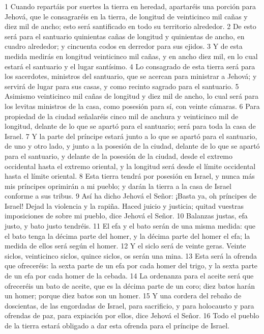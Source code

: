 1 Cuando repartáis por suertes la tierra en heredad, apartaréis una porción para Jehová, que le consagraréis en la tierra, de longitud de veinticinco mil cañas y diez mil de ancho; esto será santificado en todo su territorio alrededor.
2 De esto será para el santuario quinientas cañas de longitud y quinientas de ancho, en cuadro alrededor; y cincuenta codos en derredor para sus ejidos.
3 Y de esta medida medirás en longitud veinticinco mil cañas, y en ancho diez mil, en lo cual estará el santuario y el lugar santísimo.
4 Lo consagrado de esta tierra será para los sacerdotes, ministros del santuario, que se acercan para ministrar a Jehová; y servirá de lugar para sus casas, y como recinto sagrado para el santuario.
5 Asimismo veinticinco mil cañas de longitud y diez mil de ancho, lo cual será para los levitas ministros de la casa, como posesión para sí, con veinte cámaras.
6 Para propiedad de la ciudad señalaréis cinco mil de anchura y veinticinco mil de longitud, delante de lo que se apartó para el santuario; será para toda la casa de Israel.
7 Y la parte del príncipe estará junto a lo que se apartó para el santuario, de uno y otro lado, y junto a la posesión de la ciudad, delante de lo que se apartó para el santuario, y delante de la posesión de la ciudad, desde el extremo occidental hasta el extremo oriental, y la longitud será desde el límite occidental hasta el límite oriental.
8 Esta tierra tendrá por posesión en Israel, y nunca más mis príncipes oprimirán a mi pueblo; y darán la tierra a la casa de Israel conforme a sus tribus.
9 Así ha dicho Jehová el Señor: ¡Basta ya, oh príncipes de Israel! Dejad la violencia y la rapiña. Haced juicio y justicia; quitad vuestras imposiciones de sobre mi pueblo, dice Jehová el Señor.
10 Balanzas justas, efa justo, y bato justo tendréis. 
11 El efa y el bato serán de una misma medida: que el bato tenga la décima parte del homer, y la décima parte del homer el efa; la medida de ellos será según el homer.
12 Y el siclo será de veinte geras. Veinte siclos, veinticinco siclos, quince siclos, os serán una mina.
13 Esta será la ofrenda que ofreceréis: la sexta parte de un efa por cada homer del trigo, y la sexta parte de un efa por cada homer de la cebada.
14 La ordenanza para el aceite será que ofreceréis un bato de aceite, que es la décima parte de un coro; diez batos harán un homer; porque diez batos son un homer.
15 Y una cordera del rebaño de doscientas, de las engordadas de Israel, para sacrificio, y para holocausto y para ofrendas de paz, para expiación por ellos, dice Jehová el Señor.
16 Todo el pueblo de la tierra estará obligado a dar esta ofrenda para el príncipe de Israel.
